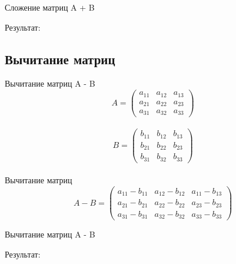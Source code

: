 \documentclass[12pt]{beamer}
\begin{document}
\begin{frame}{Сложение матриц A + B}

Результат: \\

\end{frame}


\subsection{Вычитание матриц}
\begin{frame}{Вычитание матриц A - B}
\[
  A = 
  \begin{pmatrix}
    a_{11} & a_{12} & a_{13}\\
    a_{21} & a_{22} & a_{23}\\
    a_{31} & a_{32} & a_{33}
  \end{pmatrix}
\]
\\
\[
  B = 
  \begin{pmatrix}
    b_{11} & b_{12} & b_{13}\\
    b_{21} & b_{22} & b_{23}\\
    b_{31} & b_{32} & b_{33}
  \end{pmatrix}
\]
\\
Вычитание матриц
\\
\[
  A - B = 
  \begin{pmatrix}
    a_{11} - b_{11} & a_{12} - b_{12} & a_{11} - b_{13}\\
    a_{21} - b_{21} & a_{22} - b_{22} & a_{23} - b_{23}\\
    a_{31} - b_{31} & a_{32} - b_{32} & a_{33} - b_{33}
  \end{pmatrix}
\]
\end{frame}


\begin{frame}{Вычитание матриц A - B}

Результат: \\

\end{frame}
\end{document}
